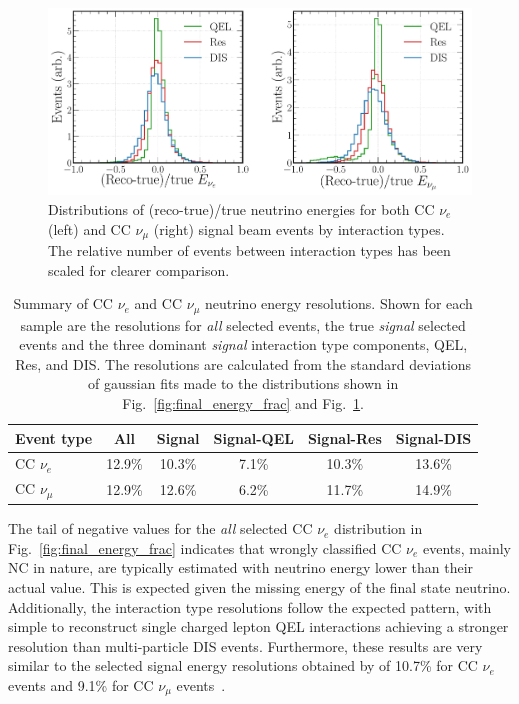 \begin{figure} %
    \includegraphics[width=\textwidth]{diagrams/7-results/final_energy_frac_split.pdf}
    \caption[Distributions of (reco-true)/true neutrino energies by interaction type]
    {Distributions of (reco-true)/true neutrino energies for both CC $\nu_{e}$ (left) and CC
        $\nu_{\mu}$ (right) signal beam events by interaction types. The relative number of events
        between interaction types has been scaled for clearer comparison.}
    \label{fig:final_energy_frac_split}
\end{figure}

\begin{table}
    \begin{tabular}{lccccc}
        Event type     & All    & Signal & Signal-QEL & Signal-Res & Signal-DIS \\
        \midrule
        CC $\nu_{e}$   & 12.9\% & 10.3\% & 7.1\%      & 10.3\%     & 13.6\%     \\
        CC $\nu_{\mu}$ & 12.9\% & 12.6\% & 6.2\%      & 11.7\%     & 14.9\%     \\
    \end{tabular}
    \caption[Summary of CC $\nu_{e}$ and CC $\nu_{\mu}$ neutrino energy resolutions]
    {Summary of CC $\nu_{e}$ and CC $\nu_{\mu}$ neutrino energy resolutions. Shown for each sample
        are the resolutions for \emph{all} selected events, the true \emph{signal} selected events
        and the three dominant \emph{signal} interaction type components, QEL, Res, and DIS. The
        resolutions are calculated from the standard deviations of gaussian fits made to the
        distributions shown in Fig.~\ref{fig:final_energy_frac} and
        Fig.~\ref{fig:final_energy_frac_split}.}
    \label{tab:energy_resolutions}
\end{table}

The tail of negative values for the \emph{all} selected CC $\nu_{e}$ distribution in
Fig.~\ref{fig:final_energy_frac} indicates that wrongly classified CC $\nu_{e}$ events, mainly NC
in nature, are typically estimated with neutrino energy lower than their actual value. This is
expected given the missing energy of the final state neutrino. Additionally, the interaction type
resolutions follow the expected pattern, with simple to reconstruct single charged lepton QEL
interactions achieving a stronger resolution than multi-particle DIS events. Furthermore, these
results are very similar to the selected signal energy resolutions obtained by \nova of 10.7\% for
CC $\nu_{e}$ events and 9.1\% for CC $\nu_{\mu}$ events~\cite{acero2019}.

